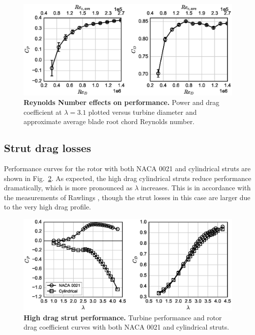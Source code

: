 \documentclass[10pt,letterpaper]{article}
\begin{document}
\begin{figure}[h]
    \includegraphics[width=\textwidth]{figures/perf_re_dep.eps}

    \caption{{\bf Reynolds Number effects on performance.} Power and drag
    coefficient at $\lambda=3.1$ plotted versus turbine diameter and approximate
    average blade root chord Reynolds number.}

    \label{fig:perf-re-dep}
\end{figure}


\subsection*{Strut drag losses}

Performance curves for the rotor with both NACA 0021 and cylindrical struts are
shown in Fig.~\ref{fig:perf-covers}. As expected, the high drag cylindrical
struts reduce performance dramatically, which is more pronounced as $\lambda$
increases. This is in accordance with the measurements of Rawlings
\cite{Rawlings2008}, though the strut losses in this case are larger due to the
very high drag profile.

\begin{figure}[ht!]
    \includegraphics[width=\textwidth]{figures/perf_covers.eps}
    
    \caption{{\bf High drag strut performance.} Turbine performance and rotor
        drag coefficient curves with both NACA 0021 and cylindrical struts.}
    
    \label{fig:perf-covers}
\end{figure}
\end{document}
